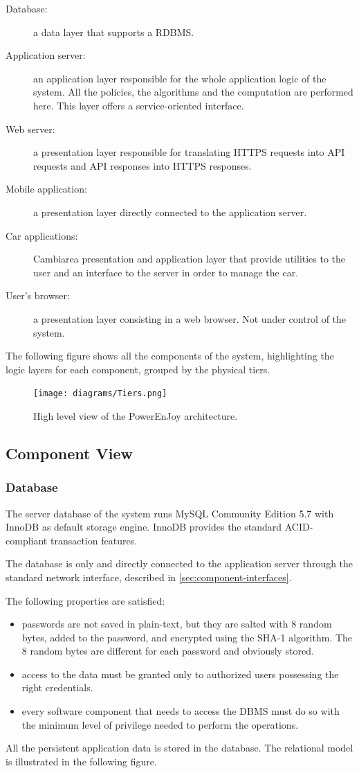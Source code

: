 \begin{description}
	\item[Database:] a data layer that supports a RDBMS.
	\item[Application server:] an application layer responsible for the whole application logic of the system. All the policies, the algorithms and the computation are performed here. This layer offers a service-oriented interface.
	\item[Web server:] a presentation layer responsible for translating HTTPS requests into API requests and API responses into HTTPS responses. 
	\item[Mobile application:] a presentation layer directly connected to the application server.
	\item[Car applications:] Cambiarea presentation and application layer that provide utilities to the user and an interface to the server in order to manage the car.
	\item[User's browser:] a presentation layer consisting in a web browser. Not under control of the system.
\end{description}
The following figure shows all the components of the system, highlighting the logic layers for each component, grouped by the physical tiers.

\begin{figure}[H]
	\centering
	\texttt{[image: diagrams/Tiers.png]}
	\caption{High level view of the PowerEnJoy architecture.}
	\label {fig:tiers}
\end{figure}

\subsection{Component View}

\subsubsection{Database}

The server database of the system runs MySQL Community Edition 5.7 with InnoDB as default storage engine.  InnoDB provides the standard ACID-compliant transaction features.

The database is only and directly connected to the application server through the standard network interface, described in \autoref{sec:component-interfaces}.

The following properties are satisfied:
\begin{itemize}
	\item passwords are not saved in plain-text, but they are salted with 8 random bytes, added to the password, and encrypted using the SHA-1 algorithm. The 8 random bytes are different for each password and obviously stored.
	\item access to the data must be granted only to authorized users possessing the right credentials.
	\item every software component that needs to access the DBMS must do so with the minimum level of privilege needed to perform the operations.
\end{itemize}
All the persistent application data is stored in the database. The relational model is illustrated in the following figure.

